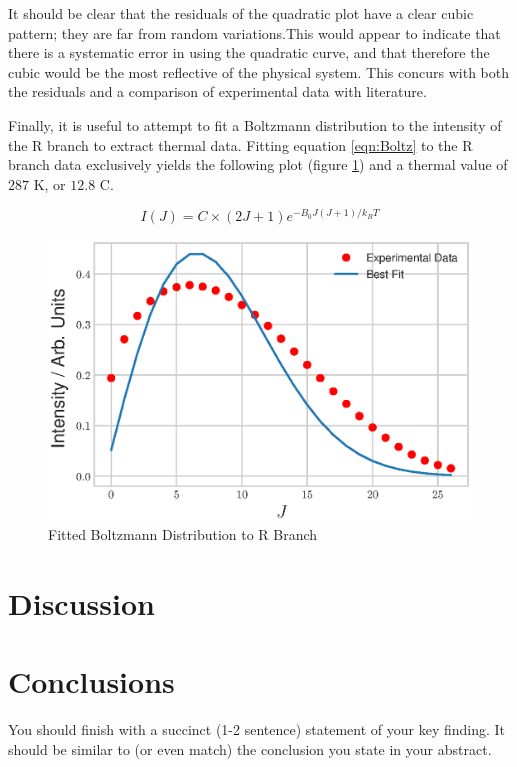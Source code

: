 \documentclass[aps,prl,reprint,10pt,amsmath,amssymb,superscriptaddress,a4paper]{revtex4-2}
\begin{document}
It should be clear that the residuals of the quadratic plot have a clear cubic pattern; they are far from random variations.This would appear to indicate that there is a systematic error in using the quadratic curve, and that therefore the cubic would be the most reflective of the physical system. This concurs with both the residuals and a comparison of experimental data with literature.

Finally, it is useful to attempt to fit a Boltzmann distribution to the intensity of the R branch to extract thermal data. Fitting equation \ref{eqn:Boltz} to the R branch data exclusively yields the following plot (figure \ref{fig:Thermals}) and a thermal value of $287$ K, or $12.8$ C.

\begin{equation}
I \left( J \right) = C \times \left( 2J + 1 \right) e^{ - B_0 J \left( J + 1 \right) /k_B T}
\label{eqn:Boltz}
\end{equation}

\begin{figure} [h]
\includegraphics[width = 8 cm]{Thermal.eps}
\caption{Fitted Boltzmann Distribution to R Branch}
\label{fig:Thermals}
\end{figure}

\section{Discussion}

\lipsum[8]

\section{Conclusions}

You should finish with a succinct (1-2 sentence) statement of your key finding. It should be similar to (or even match) the conclusion you state in your abstract.
\end{document}
